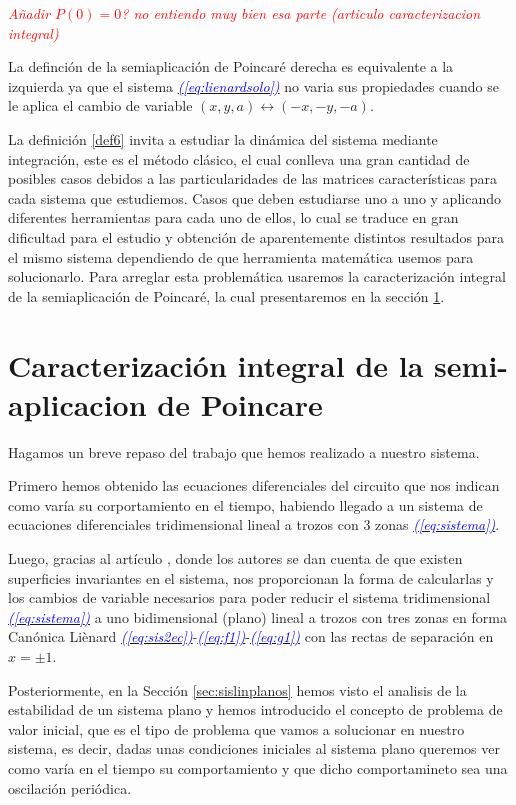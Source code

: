 \documentclass[12pt,a4paper]{report} %
\newcommand{\eref}[1]{\hyperref[#1]{\textcolor{blue}{\textit{(\ref*{#1})}}}}
\begin{document}
	\textit{\textcolor{red}{Añadir $P(0)=0$? no entiendo muy bien esa parte (articulo caracterizacion integral)}}
	
	
	La definción de la semiaplicación de Poincaré derecha es equivalente a la izquierda ya que el sistema \eref{eq:lienardsolo} no varia sus propiedades cuando se le aplica el cambio de variable $(x,y,a)\longleftrightarrow(-x,-y,-a)$.
	
	
	\vspace{0.5cm} La definición \ref{def6} invita a estudiar la dinámica del sistema mediante integración, este es el método clásico, el cual conlleva una gran cantidad de posibles casos debidos a las particularidades de las matrices características para cada sistema que estudiemos. Casos que deben estudiarse uno a uno y aplicando diferentes herramientas para cada uno de ellos, lo cual se traduce en gran dificultad para el estudio y obtención de aparentemente distintos resultados para el mismo sistema dependiendo de que herramienta matemática usemos para solucionarlo. Para arreglar esta problemática usaremos la caracterización integral de la semiaplicación de Poincaré, la cual presentaremos en la sección \ref{sec41}.
	\newpage
	
	
	
	\section{Caracterización integral de la semi-aplicacion de Poincare}
	\label{sec41}
	
	 Hagamos un breve repaso del trabajo que hemos realizado a nuestro sistema.
	

	 \noindent Primero hemos obtenido las ecuaciones diferenciales del circuito que nos indican como varía su corportamiento en el tiempo, habiendo llegado a un sistema de ecuaciones diferenciales tridimensional lineal a trozos con 3 zonas \eref{eq:sistema}. 
	
	\vspace{0.5cm}\noindent Luego, gracias al artículo \cite{ponce}, donde los autores se dan cuenta de que existen superficies invariantes en el sistema, nos proporcionan la forma de calcularlas y los cambios de variable necesarios para poder reducir el sistema tridimensional \eref{eq:sistema} a uno bidimensional (plano) lineal a trozos con tres zonas en forma Canónica Liènard \eref{eq:sis2ec}-\eref{eq:f1}-\eref{eq:g1} con las rectas de separación en $x=\pm1$. 
	
	\vspace{0.5cm}\noindent Posteriormente, en la Sección \ref{sec:sislinplanos} hemos visto el analisis de la estabilidad de un sistema plano y hemos introducido el concepto de problema de valor inicial, que es el tipo de problema que vamos a solucionar en nuestro sistema, es decir, dadas unas condiciones iniciales al sistema plano queremos ver como varía en el tiempo su comportamiento y que dicho comportamineto sea una oscilación periódica. 
	
\end{document}
